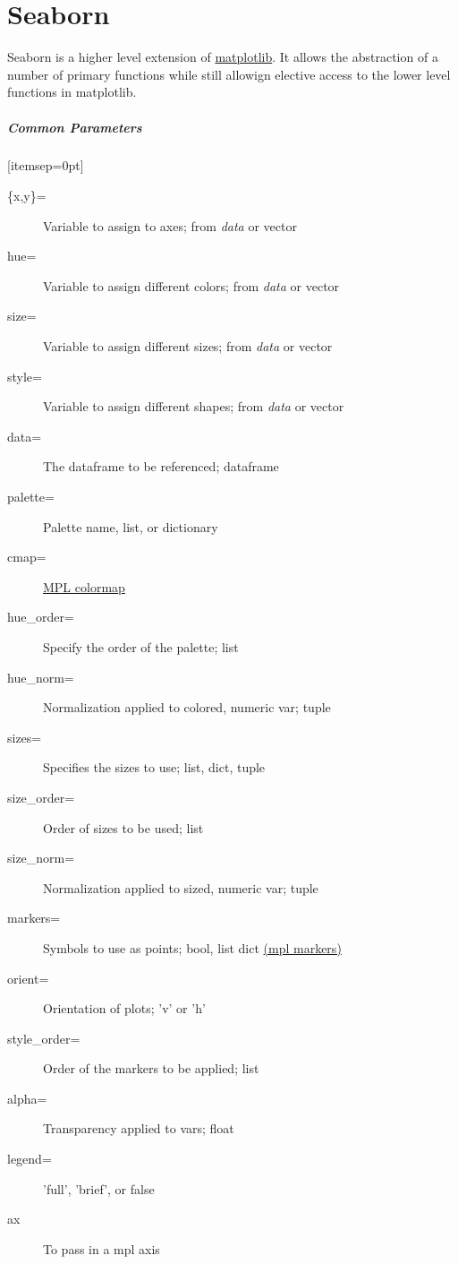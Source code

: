\chapter{Seaborn}
\label{ch:Seaborn}

Seaborn is a higher level extension of \hyperref[ch:MatPlotLib]{matplotlib}. It allows the abstraction of a number of primary functions while still allowign elective access to the lower level functions in matplotlib.

\paragraph{Common Parameters}[itemsep=0pt]
\begin{description}
	\item[\{x,y\}=] Variable to assign to axes; from \emph{data} or vector
	\item[hue=] Variable to assign different colors; from \emph{data} or vector
	\item[size=] Variable to assign different sizes; from \emph{data} or vector
	\item[style=] Variable to assign different shapes; from \emph{data} or vector
	\item[data=] The dataframe to be referenced; dataframe
	\item[palette=] Palette name, list, or dictionary
	\item[cmap=] \hyperref[sec:MPLColors]{MPL colormap}
	\item[hue\_order=] Specify the order of the palette; list
	\item[hue\_norm=] Normalization applied to colored, numeric var; tuple
	\item[sizes=] Specifies the sizes to use; list, dict, tuple
	\item[size\_order=] Order of sizes to be used; list
	\item[size\_norm=] Normalization applied to sized, numeric var; tuple
	\item[markers=] Symbols to use as points; bool, list dict \hyperref[sec:mplMarkers]{(mpl markers)}
	\item[orient=] Orientation of plots; 'v' or 'h'
	\item[style\_order=] Order of the markers to be applied; list
	\item[alpha=] Transparency applied to vars; float
	\item[legend=] 'full', 'brief', or false
	\item[ax] To pass in a mpl axis
\end{description}

